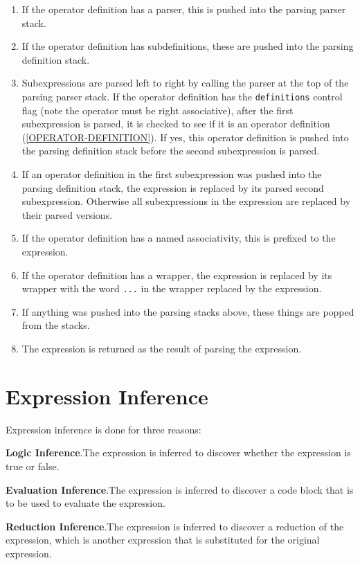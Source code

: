 \documentclass[12pt]{article}
\makeatletter
\newcommand{\ttmkey}[2]{{\tt #1}\index{#1@{\tt #1}!#2}}
\newenvironment{indpar}[1][0.3in]%
	{\begin{list}{}%
		     {\setlength{\itemsep}{0in}%
		      \setlength{\topsep}{0in}%
		      \setlength{\parsep}{1ex}%
		      \setlength{\labelwidth}{#1}%
		      \setlength{\leftmargin}{#1}%
		      \addtolength{\leftmargin}{\labelsep}}%
	 \item}%
	{\end{list}}
\makeatother
\begin{document}
\begin{enumerate}

\item
If the operator definition has a parser, this is pushed into the
parsing parser stack.

\item
If the operator definition has subdefinitions, these are pushed into the
parsing definition stack.


\item
Subexpressions are parsed left to right by calling the parser at the
top of the parsing parser stack.  If the operator definition has the
\ttmkey{definitions}{control flag} control flag (note the operator must
be right associative), after the first subexpression is parsed,
it is checked to see if it is an operator definition
(\ref{OPERATOR-DEFINITION}).  If yes, this operator definition is pushed
into the parsing definition stack before the second subexpression is parsed.

\item
If an operator definition in the first subexpression was pushed into
the parsing definition stack, the expression is replaced by its parsed
second subexpression.  Otherwise all subexpressions in the expression
are replaced by their parsed versions.

\item
If the operator definition has a named associativity, this is prefixed
to the expression.

\item
If the operator definition has a wrapper, the expression is
replaced by its wrapper with the word \verb|...| in the wrapper
replaced by the expression.

\item
If anything was pushed into the parsing stacks above, these things
are popped from the stacks.

\item
The expression is returned as the result of parsing the expression.

\end{enumerate}


\section{Expression Inference}
\label{EXPRESSION-INFERENCE}

Expression inference is done for three reasons:

\begin{indpar}

{\bf Logic Inference}.The expression is
inferred to discover whether the expression is true or false.

{\bf Evaluation Inference}.The expression is
inferred to discover a code block that is to be used to evaluate the expression.

{\bf Reduction Inference}.The expression is
inferred to discover a reduction of the expression, which is another
expression that is substituted for the original expression.

\end{indpar}
\end{document}
